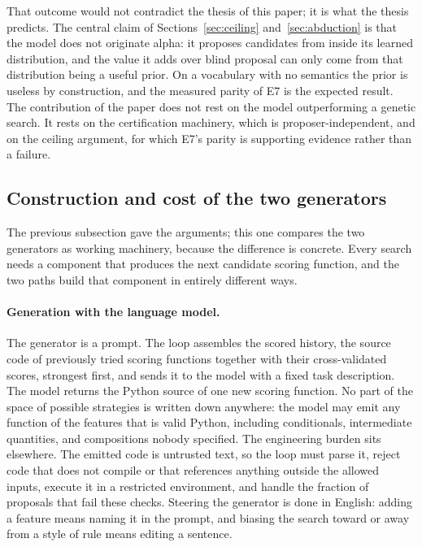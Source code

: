 \documentclass[11pt]{article}
\begin{document}
That outcome would not contradict the thesis of this paper; it is what the thesis predicts. The central
claim of Sections~\ref{sec:ceiling} and~\ref{sec:abduction} is that the model does not originate alpha:
it proposes candidates from inside its learned distribution, and the value it adds over blind proposal
can only come from that distribution being a useful prior. On a vocabulary with no semantics the prior
is useless by construction, and the measured parity of E7 is the expected result. The contribution of
the paper does not rest on the model outperforming a genetic search. It rests on the certification
machinery, which is proposer-independent, and on the ceiling argument, for which E7's parity is
supporting evidence rather than a failure.

\subsection{Construction and cost of the two generators}
\label{sec:generation}

The previous subsection gave the arguments; this one compares the two generators as working machinery,
because the difference is concrete. Every search needs a component that produces the next candidate
scoring function, and the two paths build that component in entirely different ways.

\paragraph{Generation with the language model.} The generator is a prompt. The loop assembles the
scored history, the source code of previously tried scoring functions together with their
cross-validated scores, strongest first, and sends it to the model with a fixed task description. The
model returns the Python source of one new scoring function. No part of the space of possible
strategies is written down anywhere: the model may emit any function of the features that is valid
Python, including conditionals, intermediate quantities, and compositions nobody specified. The
engineering burden sits elsewhere. The emitted code is untrusted text, so the loop must parse it,
reject code that does not compile or that references anything outside the allowed inputs, execute it in
a restricted environment, and handle the fraction of proposals that fail these checks. Steering the
generator is done in English: adding a feature means naming it in the prompt, and biasing the search
toward or away from a style of rule means editing a sentence.
\end{document}
